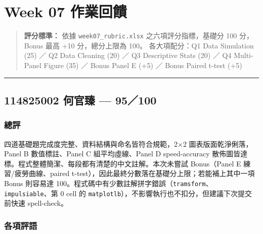 \documentclass[
  14pt,
]{extarticle}
\author{}
\date{}
\begin{document}
\hypertarget{week-07-ux4f5cux696dux56deux994b}{%
\section{Week 07 作業回饋}\label{week-07-ux4f5cux696dux56deux994b}}

\begin{quote}
\textbf{評分標準：} 依據 \texttt{week07\_rubric.xlsx}
之六項評分指標，基礎分 100 分，Bonus 最高 +10 分，總分上限為 100。
各大項配分：Q1 Data Simulation (25) ／ Q2 Data Cleaning (20) ／ Q3
Descriptive Stats (20) ／ Q4 Multi-Panel Figure (35) ／ Bonus Panel E
(+5) ／ Bonus Paired t-test (+5)
\end{quote}

\begin{center}\rule{0.5\linewidth}{0.5pt}\end{center}

\hypertarget{ux4f55ux5b98ux81fb-95100}{%
\subsection{114825002 何官臻 ---
95／100}\label{ux4f55ux5b98ux81fb-95100}}

\hypertarget{ux7e3dux8a55}{%
\subsubsection{總評}\label{ux7e3dux8a55}}

四道基礎題完成度完整、資料結構與命名皆符合規範，2×2
圖表版面乾淨俐落，Panel B 數值標註、Panel C 組平均虛線、Panel D
speed-accuracy
散佈圖皆達標。程式整體簡潔、每段都有清楚的中文註解。本次未嘗試
Bonus（Panel E 練習/疲勞曲線、paired
t-test），因此最終分數落在基礎分上限；若能補上其中一項 Bonus 則容易達
100。程式碼中有少數註解拼字錯誤（\texttt{tramsform}、\texttt{impulsiable}、第
0 cell 的 \texttt{matplotlb}），不影響執行也不扣分，但建議下次提交前快速
spell-check。

\hypertarget{ux5404ux9805ux8a55ux8a9e}{%
\subsubsection{各項評語}\label{ux5404ux9805ux8a55ux8a9e}}
\end{document}
